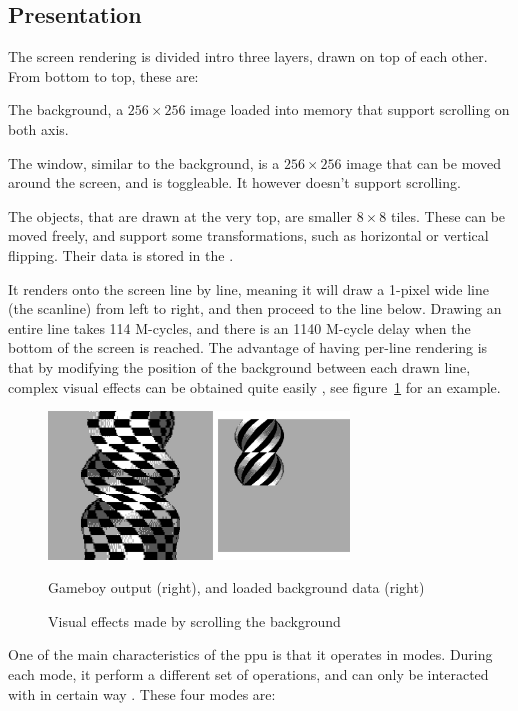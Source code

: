 \documentclass[11pt]{report}
\begin{document}
\subsection{Presentation}

The screen rendering is divided intro three layers, drawn on top of each other. From bottom to top, these are:

\begin{compactitem}
	\item The background, a $256 \times 256$ image loaded into memory that support scrolling on both axis.
	\item The window, similar to the background, is a $256 \times 256$ image that can be moved around the screen, and is toggleable. It however doesn't support scrolling.
	\item The objects, that are drawn at the very top, are smaller $8 \times 8$ tiles. These can be moved freely, and support some transformations, such as horizontal or vertical flipping. Their data is stored in the .
\end{compactitem}

It renders onto the screen line by line, meaning it will draw a 1-pixel wide line (the scanline) from left to right, and then proceed to the line below. Drawing an entire line takes 114 M-cycles, and there is an 1140 M-cycle delay when the bottom of the screen is reached. The advantage of having per-line rendering is that by modifying the position of the background between each drawn line, complex visual effects can be obtained quite easily \cite{gameboy_talk}, see figure~\ref{fig:background-transform} for an example.

\begin{figure}[h]
    \centering
    \includegraphics[width=8cm]{images/background-transform}\\
    \caption{Visual effects made by scrolling the background}
    Gameboy output (right), and loaded background data (right)
    \label{fig:background-transform}
\end{figure}

One of the main characteristics of the \gls{ppu} is that it operates in modes. During each mode, it perform a different set of operations, and can only be interacted with in certain way \cite[LCD Status Registers]{pandoc}. These four modes are:
\end{document}
